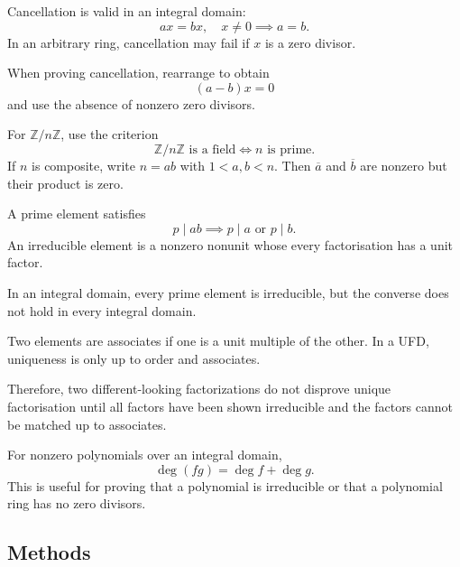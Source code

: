 \begin{mistake}
  Cancellation is valid in an integral domain:
  \[
  ax=bx,\quad x\neq0\implies a=b.
  \]
  In an arbitrary ring, cancellation may fail if $x$ is a zero divisor.

  When proving cancellation, rearrange to obtain
  \[
  (a-b)x=0
  \]
  and use the absence of nonzero zero divisors.
\end{mistake}

\begin{mistake}
  For $\mathbb{Z}/n\mathbb{Z}$, use the criterion
  \[
  \mathbb{Z}/n\mathbb{Z}\text{ is a field}
  \iff n\text{ is prime}.
  \]
  If $n$ is composite, write $n=ab$ with $1<a,b<n$. Then $\overline{a}$ and $\overline{b}$ are nonzero but their product is zero.
\end{mistake}

\begin{mistake}
  A prime element satisfies
  \[
  p\mid ab\implies p\mid a\text{ or }p\mid b.
  \]
  An irreducible element is a nonzero nonunit whose every factorisation has a unit factor.

  In an integral domain, every prime element is irreducible, but the converse does not hold in every integral domain.
\end{mistake}

\begin{mistake}
  Two elements are associates if one is a unit multiple of the other. In a UFD, uniqueness is only up to order and associates.

  Therefore, two different-looking factorizations do not disprove unique factorisation until all factors have been shown irreducible and the factors cannot be matched up to associates.
\end{mistake}

\begin{mistake}
  For nonzero polynomials over an integral domain,
  \[
  \deg(fg)=\deg f+\deg g.
  \]
  This is useful for proving that a polynomial is irreducible or that a polynomial ring has no zero divisors.
\end{mistake}


\subsection{Methods}

